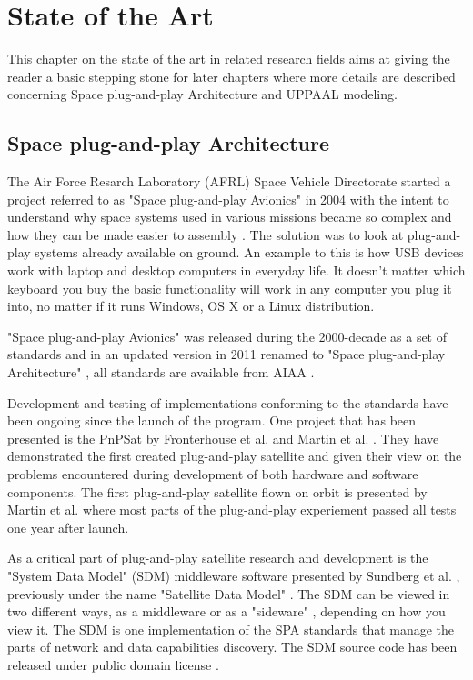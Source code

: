 \chapter{State of the Art} \label{ch:state_of_the_art}
This chapter on the state of the art in related research fields aims at giving
the reader a basic stepping stone for later chapters where more details are
described concerning Space plug-and-play Architecture and UPPAAL modeling.

\section{Space plug-and-play Architecture}
The Air Force Resarch Laboratory (AFRL) Space Vehicle Directorate started a
project referred to as "Space plug-and-play Avionics" in 2004 with the intent
to understand why space systems used in various missions became so complex and
how they can be made easier to assembly \cite{fronterhouse2007, martin2012}.
The solution was to look at plug-and-play systems already available on ground.
An example to this is how USB devices work with laptop and desktop computers in
everyday life. It doesn't matter which keyboard you buy the basic functionality
will work in any computer you plug it into, no matter if it runs Windows, OS X
or a Linux distribution.

"Space plug-and-play Avionics" was released during the 2000-decade as a set of
standards and in an updated version in 2011 renamed to "Space plug-and-play
Architecture" \cite{martin2012}, all standards are available from AIAA
\cite{spa:all}.


Development and testing of implementations conforming to the standards have
been ongoing since the launch of the program. One project that has been
presented is the PnPSat by Fronterhouse et al. \cite{fronterhouse2007} and
Martin et al. \cite{martin2008}. They have demonstrated the first created
plug-and-play satellite and given their view on the problems encountered during
development of both hardware and software components. The first plug-and-play
satellite flown on orbit is presented by Martin et al. \cite{martin2012} where
most parts of the plug-and-play experiement passed all tests one year after
launch.

As a critical part of plug-and-play satellite research and development is the
"System Data Model" (SDM) middleware software presented by Sundberg et al.
\cite{sundberg2006}, previously under the name "Satellite Data Model"
\cite{spa:sdm-source}. The SDM can be viewed in two different ways, as a
middleware or as a "sideware" \cite{fronterhouse2007}, depending on how you
view it. The SDM is one implementation of the SPA standards that manage the
parts of network and data capabilities discovery. The SDM source code has been
released under public domain license \cite{spa:sdm-source}.

